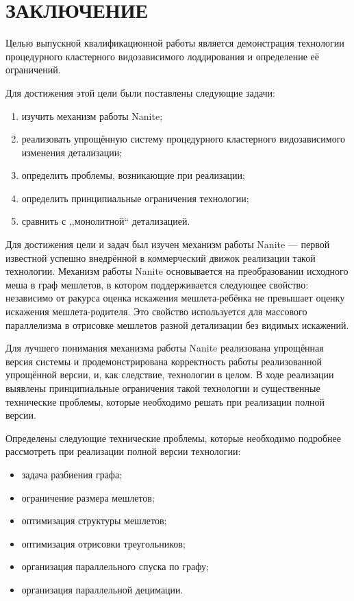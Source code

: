 \clearpage
\section{ЗАКЛЮЧЕНИЕ}
Целью выпускной квалификационной работы является демонстрация технологии процедурного кластерного видозависимого лоддирования и определение её ограничений.

Для достижения этой цели были поставлены следующие задачи:
\begin{enumerate}
    \item изучить механизм работы Nanite;
    \item реализовать упрощённую систему процедурного кластерного видозависимого изменения детализации;
    \item определить проблемы, возникающие при реализации;
    \item определить принципиальные ограничения технологии;
    \item сравнить с ,,монолитной`` детализацией.
\end{enumerate}

Для достижения цели и задач был изучен механизм работы Nanite --- первой известной успешно внедрённой в коммерческий движок реализации такой технологии.
Механизм работы Nanite основывается на преобразовании исходного меша в граф мешлетов, в котором поддерживается следующее свойство: независимо от ракурса оценка искажения мешлета-ребёнка не превышает оценку искажения мешлета-родителя.
Это свойство используется для массового параллелизма в отрисовке мешлетов разной детализации без видимых искажений.

Для лучшего понимания механизма работы Nanite реализована упрощённая версия системы и продемонстрирована корректность работы реализованной упрощённой версии, и, как следствие, технологии в целом.
В ходе реализации выявлены принципиальные ограничения такой технологии и существенные технические проблемы, которые необходимо решать при реализации полной версии.

Определены следующие технические проблемы, которые необходимо подробнее рассмотреть при реализации полной версии технологии:
\begin{itemize}
    \item задача разбиения графа;
    \item ограничение размера мешлетов;
    \item оптимизация структуры мешлетов;
    \item оптимизация отрисовки треугольников;
    \item организация параллельного спуска по графу;
    \item организация параллельной децимации.
\end{itemize}

